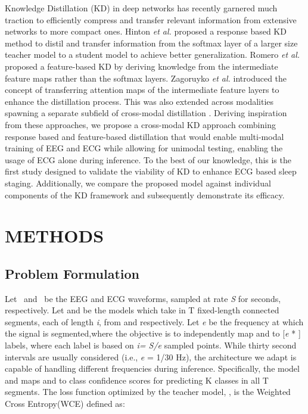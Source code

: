 \documentclass[letterpaper, 10 pt, conference]{ieeeconf}
\begin{document}
Knowledge Distillation (KD) in deep networks has recently garnered much traction to efficiently compress and transfer relevant information from extensive networks to more compact ones. Hinton \textit{et al.} \cite{hinton2015distilling} proposed a response based KD method to distil and transfer information from the softmax layer of a larger size teacher model to a student model to achieve better generalization. Romero \textit{et al.} \cite{romero2014fitnets} proposed a feature-based KD by deriving knowledge from the intermediate feature maps rather than the softmax layers. Zagoruyko \textit{et al.} \cite{komodakis2017paying} introduced the concept of transferring attention maps of the intermediate feature layers to enhance the distillation process. This was also extended across modalities spawning a separate subfield of cross-modal distillation \cite{gou2021knowledge}.
Deriving inspiration from these approaches, we propose a cross-modal KD approach combining response based and feature-based distillation that would enable multi-modal training of EEG and ECG while allowing for unimodal testing, enabling the usage of ECG alone during inference. To the best of our knowledge, this is the first study designed to validate the viability of KD to enhance ECG based sleep staging. Additionally, we compare the proposed model against individual components of the KD framework and subsequently demonstrate its efficacy.

\section{METHODS}
\subsection{Problem Formulation}



Let  \ and  \ be the EEG and ECG waveforms, sampled at rate \textit{S} for  seconds, respectively. Let  and  be the models which take in T fixed-length connected
segments, each of length \textit{i}, from  and  respectively. Let \textit{e}  be the frequency at which the signal is segmented,where the objective is to independently map  and  to [\textit{e} * ] labels,
where each label is based on \textit{i= S/\textit{e}} sampled points. While thirty second intervals are usually considered (i.e., \textit{e} = 1/30 Hz), the architecture we adapt is capable of handling different frequencies during inference. Specifically, the model  and 
maps  and  to class confidence scores for predicting K
classes in all T segments. The loss function optimized by the teacher model, , is the Weighted Cross Entropy(WCE) defined as:
\end{document}
